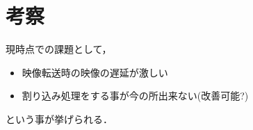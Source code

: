 \section{考察}
現時点での課題として，
\begin{itemize}
\item 映像転送時の映像の遅延が激しい
\item 割り込み処理をする事が今の所出来ない(改善可能?) 
\end{itemize}
という事が挙げられる．
